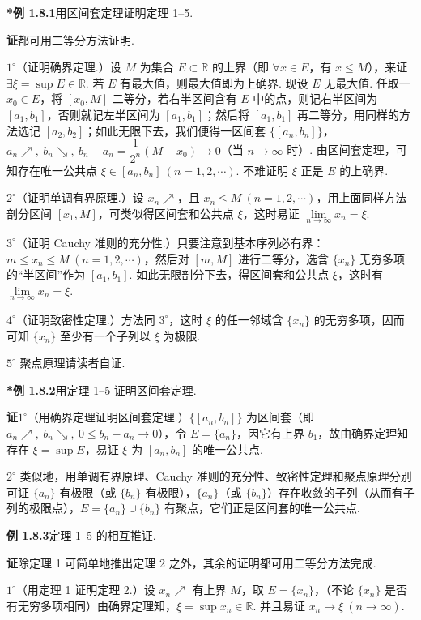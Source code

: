 \documentclass[UTF8,12pt,a4paper,fontset=fandol]{ctexart}
\begin{document}
\noindent\textbf{*例 1.8.1}\quad 用区间套定理证明定理 1--5.

\noindent\textbf{证}\quad 都可用二等分方法证明.

$1^\circ$（证明确界定理.）设 $M$ 为集合 $E\subset\mathbb{R}$ 的上界（即 $\forall x\in E$，有 $x\le M$），来证 $\exists\xi=\sup E\in\mathbb{R}$. 若 $E$ 有最大值，则最大值即为上确界. 现设 $E$ 无最大值. 任取一 $x_0\in E$，将 $[x_0,M]$ 二等分，若右半区间含有 $E$ 中的点，则记右半区间为 $[a_1,b_1]$，否则就记左半区间为 $[a_1,b_1]$；然后将 $[a_1,b_1]$ 再二等分，用同样的方法选记 $[a_2,b_2]$；如此无限下去，我们便得一区间套 $\{[a_n,b_n]\}$，$a_n\nearrow,\ b_n\searrow,\ b_n-a_n=\dfrac1{2^n}(M-x_0)\to0$（当 $n\to\infty$ 时）. 由区间套定理，可知存在唯一公共点 $\xi\in[a_n,b_n]\ (n=1,2,\cdots)$. 不难证明 $\xi$ 正是 $E$ 的上确界.

$2^\circ$（证明单调有界原理.）设 $x_n\nearrow$，且 $x_n\le M\ (n=1,2,\cdots)$，用上面同样方法剖分区间 $[x_1,M]$，可类似得区间套和公共点 $\xi$，这时易证 $\lim\limits_{n\to\infty}x_n=\xi$.

$3^\circ$（证明 Cauchy 准则的充分性.）只要注意到基本序列必有界：$m\le x_n\le M\ (n=1,2,\cdots)$，然后对 $[m,M]$ 进行二等分，选含 $\{x_n\}$ 无穷多项的“半区间”作为 $[a_1,b_1]$. 如此无限剖分下去，得区间套和公共点 $\xi$，这时有 $\lim\limits_{n\to\infty}x_n=\xi$.

$4^\circ$（证明致密性定理.）方法同 $3^\circ$，这时 $\xi$ 的任一邻域含 $\{x_n\}$ 的无穷多项，因而可知 $\{x_n\}$ 至少有一个子列以 $\xi$ 为极限.

$5^\circ$ 聚点原理请读者自证.

\noindent\textbf{*例 1.8.2}\quad 用定理 1--5 证明区间套定理.

\noindent\textbf{证}\quad $1^\circ$（用确界定理证明区间套定理.）$\{[a_n,b_n]\}$ 为区间套（即 $a_n\nearrow,\ b_n\searrow,\ 0\le b_n-a_n\to0$），令 $E=\{a_n\}$，因它有上界 $b_1$，故由确界定理知存在 $\xi=\sup E$，易证 $\xi$ 为 $[a_n,b_n]$ 的唯一公共点.

$2^\circ$ 类似地，用单调有界原理、Cauchy 准则的充分性、致密性定理和聚点原理分别可证 $\{a_n\}$ 有极限（或 $\{b_n\}$ 有极限），$\{a_n\}$（或 $\{b_n\}$）存在收敛的子列（从而有子列的极限点），$E=\{a_n\}\cup\{b_n\}$ 有聚点，它们正是区间套的唯一公共点.

\noindent\textbf{例 1.8.3}\quad 定理 1--5 的相互推证.

\noindent\textbf{证}\quad 除定理 1 可简单地推出定理 2 之外，其余的证明都可用二等分方法完成.

$1^\circ$（用定理 1 证明定理 2.）设 $x_n\nearrow$ 有上界 $M$，取 $E=\{x_n\}$，（不论 $\{x_n\}$ 是否有无穷多项相同）由确界定理知，$\xi=\sup x_n\in\mathbb{R}$. 并且易证 $x_n\to\xi\ (n\to\infty)$.
\end{document}
